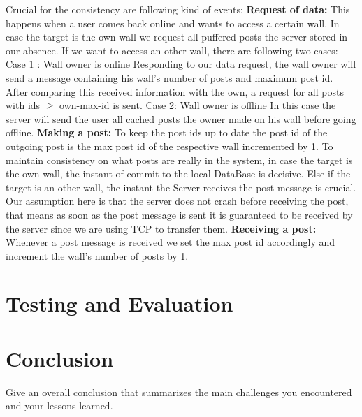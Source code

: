 \documentclass{report}
\begin{document}
Crucial for the consistency are following kind of events:\newline
\textbf{Request of data:} This happens when a user comes back online and wants to access a certain wall.  
In case the target is the own wall we request all puffered posts the server stored in our absence.
If we want to access an other wall, there are following two cases:\newline
Case 1 : Wall owner is online
Responding to our data request, the wall owner will send a message containing his wall's number of posts and maximum post id. After comparing this received information with the own, a request for all posts with ids $\geq$ own-max-id is sent.\newline
Case 2: Wall owner is offline
In this case the server will send the user all cached posts the owner made on his wall before going offline.\newline
\textbf{Making a post:}
To keep the post ids up to date the post id of the outgoing post is the max post id of the respective wall incremented by 1.\newline
To maintain consistency on what posts are really in the system, in case the target is the own wall, the instant of commit to the local DataBase is decisive.
Else if the target is an other wall, the instant the Server receives the post message is crucial. Our assumption here is that the server does not crash before receiving the post, that means as soon as the post message is sent it is guaranteed to be received by the server since we are using TCP to transfer them.\newline
\textbf{Receiving a post:}
Whenever a post message is received we set the max post id accordingly and increment the wall's number of posts by 1.








\section{Testing and Evaluation}

\section{Conclusion}

Give an overall conclusion that summarizes the main challenges you encountered and your lessons learned.



\end{document}
